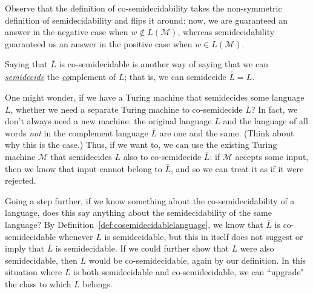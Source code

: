Observe that the definition of co-semidecidability takes the non-symmetric definition of semidecidability and flips it around: now, we are guaranteed an answer in the negative case when $w \not\in L(\mathcal{M})$, whereas semidecidability guaranteed us an answer in the positive case when $w \in L(\mathcal{M})$.

\begin{dangerous}
Saying that $\overline{L}$ is co-semidecidable is another way of saying that we can \emph{\ul{semidecide}} the \emph{\ul{co}}mplement of $\overline{L}$; that is, we can semidecide $\overline{\overline{L}} = L$.
\end{dangerous}

One might wonder, if we have a Turing machine that semidecides some language $L$, whether we need a separate Turing machine to co-semidecide $\overline{L}$? In fact, we don't always need a new machine: the original language $L$ and the language of all words \emph{not} in the complement language $\overline{L}$ are one and the same. (Think about why this is the case.) Thus, if we want to, we can use the existing Turing machine $\mathcal{M}$ that semidecides $L$ also to co-semidecide $\overline{L}$: if $\mathcal{M}$ accepts some input, then we know that input cannot belong to $\overline{L}$, and so we can treat it as if it were rejected.

Going a step further, if we know something about the co-semidecidability of a language, does this say anything about the semidecidability of the same language? By Definition~\ref{def:cosemidecidablelanguage}, we know that $\overline{L}$ is co-semidecidable whenever $L$ is semidecidable, but this in itself does not suggest or imply that $\overline{L}$ is semidecidable. If we could further show that $\overline{L}$ were also semidecidable, then $L$ would be co-semidecidable, again by our definition. In this situation where $L$ is both semidecidable and co-semidecidable, we can ``upgrade" the class to which $L$ belongs.

